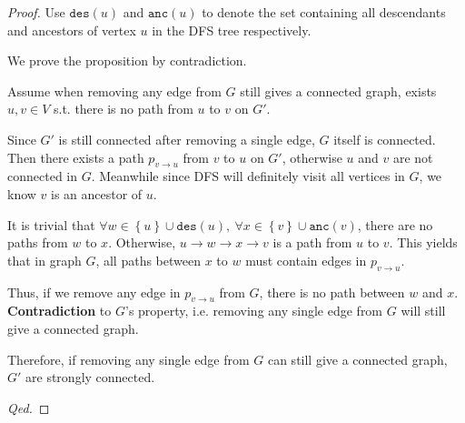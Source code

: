 \documentclass{article}
\begin{document}
\begin{proof}
    Use $\mathtt{des}(u)$ and $\mathtt{anc}(u)$ to denote the set containing all descendants and ancestors of vertex $u$ in the DFS tree respectively.
    
    \hspace{1.3em}
    We prove the proposition by contradiction. 
    
    \hspace{1.3em}
    Assume when removing any edge from $G$ still gives a connected graph, exists $u,v\in V$ s.t. there is no path from $u$ to $v$ on $G'$.
    
    \hspace{1.3em}
    Since $G'$ is still connected after removing a single edge, $G$ itself is connected. Then there exists a path $p_{v\rightarrow u}$ from $v$ to $u$ on $G'$, otherwise $u$ and $v$ are not connected in $G$. Meanwhile since DFS will definitely visit all vertices in $G$, we know $v$ is an ancestor of $u$.
    
    \hspace{1.3em}
    It is trivial that $\forall w\in \left\{u\right\}\cup\mathtt{des}(u),\ \forall x\in\left\{v\right\}\cup\mathtt{anc}(v)$, there are no paths from $w$ to $x$. Otherwise, $u\rightarrow w\rightarrow x\rightarrow v$ is a path from $u$ to $v$. This yields that in graph $G$, all paths between $x$ to $w$ must contain edges in $p_{v\rightarrow u}$. 
    
    \hspace{1.3em}
    Thus, if we remove any edge in $p_{v\rightarrow u}$ from $G$, there is no path between $w$ and $x$. \textbf{Contradiction} to $G$'s property, i.e. removing any single edge from $G$ will still give a connected graph.
    
    \vspace{2em} \hspace{1.3em}
    Therefore, if removing any single edge from $G$ can still give a connected graph, $G'$ are strongly connected.
    
    \hspace{38.75em}
    \textit{Qed.}
\end{proof}

\newpage
\end{document}
